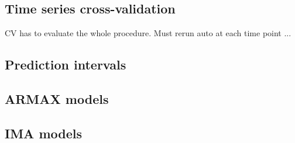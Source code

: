 \documentclass{article}
\begin{document}
\subsection{Time series cross-validation}

CV has to evaluate the whole procedure. Must rerun auto at each time point ...

\subsection{Prediction intervals}


\subsection{ARMAX models}

\subsection{IMA models}
\end{document}
